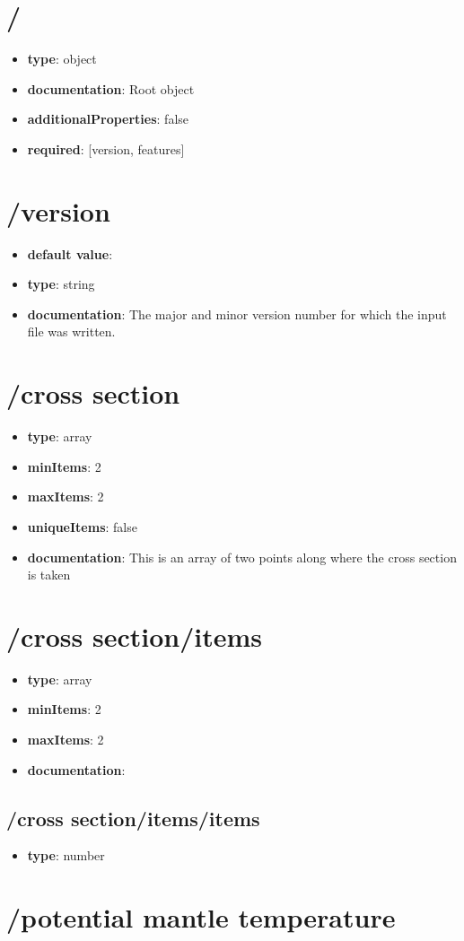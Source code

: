 \section{/}
\begin{itemize}\item {\bf type}: object
\item {\bf documentation}: Root object
\item {\bf additionalProperties}: false
\item {\bf required}: [version, features]\end{itemize}
\section{/version}
\begin{itemize}\item {\bf default value}: 
\item {\bf type}: string
\item {\bf documentation}: The major and minor version number for which the input file was written.
\end{itemize}\section{/cross section}
\begin{itemize}\item {\bf type}: array
\item {\bf minItems}: 2
\item {\bf maxItems}: 2
\item {\bf uniqueItems}: false
\item {\bf documentation}: This is an array of two points along where the cross section is taken
\end{itemize}\section{/cross section/items}
\begin{itemize}\item {\bf type}: array
\item {\bf minItems}: 2
\item {\bf maxItems}: 2
\item {\bf documentation}: 
\end{itemize}\subsection{/cross section/items/items}
\begin{itemize}\item {\bf type}: number
\end{itemize}\section{/potential mantle temperature}
